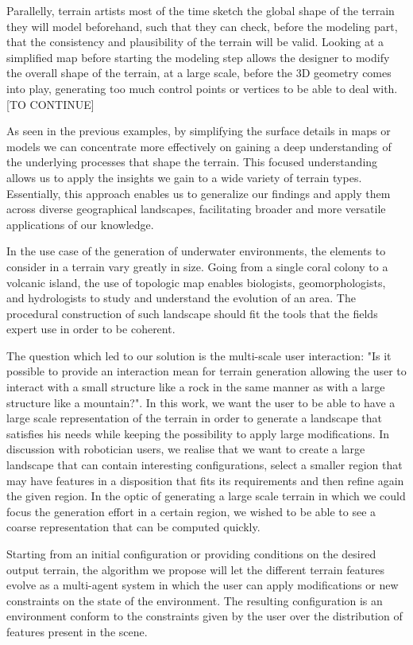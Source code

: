 Parallelly, terrain artists most of the time sketch the global shape of the terrain they will model beforehand, such that they can check, before the modeling part, that the consistency and plausibility of the terrain will be valid. Looking at a simplified map before starting the modeling step allows the designer to modify the overall shape of the terrain, at a large scale, before the 3D geometry comes into play, generating too much control points or vertices to be able to deal with. [TO CONTINUE]


As seen in the previous examples, by simplifying the surface details in maps or models we can concentrate more effectively on gaining a deep understanding of the underlying processes that shape the terrain. This focused understanding allows us to apply the insights we gain to a wide variety of terrain types. Essentially, this approach enables us to generalize our findings and apply them across diverse geographical landscapes, facilitating broader and more versatile applications of our knowledge.

In the use case of the generation of underwater environments, the elements to consider in a terrain vary greatly in size. Going from a single coral colony to a volcanic island, the use of topologic map enables biologists, geomorphologists, and hydrologists to study and understand the evolution of an area. The procedural construction of such landscape should fit the tools that the fields expert use in order to be coherent. 

The question which led to our solution is the multi-scale user interaction: "Is it possible to provide an interaction mean for terrain generation allowing the user to interact with a small structure like a rock in the same manner as with a large structure like a mountain?". 
In this work, we want the user to be able to have a large scale representation of the terrain in order to generate a landscape that satisfies his needs while keeping the possibility to apply large modifications.
In discussion with robotician users, we realise that we want to create a large landscape that can contain interesting configurations, select a smaller region that may have features in a disposition that fits its requirements and then refine again the given region.
In the optic of generating a large scale terrain in which we could focus the generation effort in a certain region, we wished to be able to see a coarse representation that can be computed quickly.

Starting from an initial configuration or providing conditions on the desired output terrain, the algorithm we propose will let the different terrain features evolve as a multi-agent system in which the user can apply modifications or new constraints on the state of the environment. The resulting configuration is an environment conform to the constraints given by the user over the distribution of features present in the scene.

